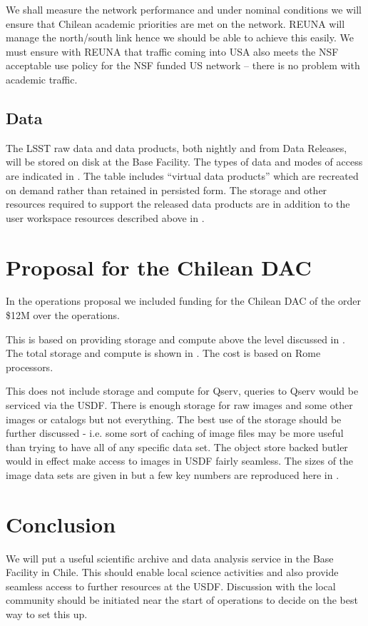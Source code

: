 We shall measure the network performance and under nominal conditions we will ensure that Chilean academic priorities are met on the network.
REUNA will manage the north/south link hence we should be able to achieve this easily.
We must ensure with REUNA that traffic coming into USA also meets the NSF acceptable use policy for the NSF funded US network -- there is no problem with academic traffic.


\subsection{Data}
\label{sec:data}

The LSST raw data and data products, both nightly and from Data Releases, will be stored on disk at the Base Facility.
The types of data and modes of access are indicated in .
The table includes ``virtual data products'' which are recreated on demand rather than retained in persisted form.
The storage and other resources required to support the released data products are in addition to the user workspace resources described above in .




\section{Proposal for the Chilean DAC}\label{sec:prop}

In the operations proposal  we included funding for the Chilean DAC of the order \$12M over the operations.

This is based on providing storage and compute above the level discussed in .
The total storage and compute is shown in . The cost is based on Rome processors.


This does not include storage and compute for Qserv, queries to Qserv would be serviced via the USDF.
There is enough storage for raw images and some other images or catalogs but not everything.
The best use of the storage should be further discussed - i.e. some sort of caching of image files may be more useful than trying to have all of any specific data set.
The object store backed butler would in effect make access to images in USDF fairly seamless.
The sizes of the image data sets are given in  but a few key numbers are reproduced here in .





\section{Conclusion}

We will put a useful scientific archive and data analysis service in the Base Facility in Chile.
This should enable local science activities and also provide seamless access to further resources at the USDF.
Discussion with the local community should be initiated near the start of operations to decide on the best way to set this up.
